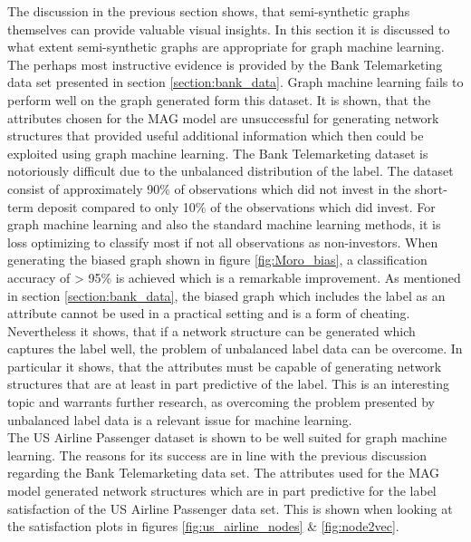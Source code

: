   The discussion in the previous section shows, that semi-synthetic graphs
  themselves can provide valuable visual insights. In this section it is
  discussed to what extent semi-synthetic graphs are appropriate for graph
  machine learning. The perhaps most instructive evidence is provided by the Bank
  Telemarketing data set presented in section \ref{section:bank_data}. Graph
  machine learning fails to perform well on the graph generated form this
  dataset. It is shown, that the attributes chosen for the MAG model are
  unsuccessful for generating network structures that provided useful additional
  information which then could be exploited using graph machine learning. The 
  Bank Telemarketing dataset is notoriously difficult due to the unbalanced
  distribution of the label. The dataset consist of approximately 90\% of
  observations which did not invest in the short-term deposit compared to only 
  10\% of the observations which did invest. For graph machine learning and
  also the standard machine learning methods, it is loss optimizing to
  classify most if not all observations as non-investors. When generating the
  biased graph shown in figure \ref{fig:Moro_bias}, a classification accuracy
  of > 95\% is achieved which is a remarkable improvement. As mentioned in 
  section \ref{section:bank_data}, the biased graph which includes the label
  as an attribute cannot be used in a practical setting and is a form of
  cheating. Nevertheless it shows, that if a network structure can be generated
  which captures the label well, the problem of unbalanced label data can be
  overcome. In particular it shows, that the attributes must be capable of
  generating network structures that are at least in part predictive of the
  label. This is an interesting topic and warrants further research, as
  overcoming the problem presented by unbalanced label data is a relevant issue
  for machine learning. \\

  \noindent The US Airline Passenger dataset is shown to be well suited for 
  graph machine learning. The reasons for its success are in line with the 
  previous discussion regarding the Bank Telemarketing data set. The attributes 
  used for the MAG model generated network structures which are in part 
  predictive for the label satisfaction of the US Airline Passenger data set. 
  This is shown when looking at the satisfaction plots in figures 
  \ref{fig:us_airline_nodes} \& \ref{fig:node2vec}. \\ 

